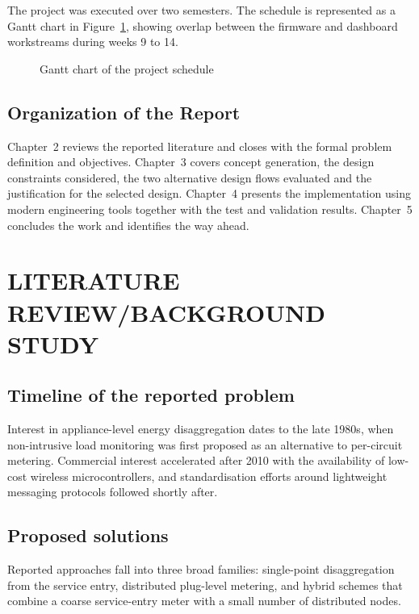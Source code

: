 \documentclass[12pt,a4paper]{report}
\newcommand{\phbox}[2][0.72\textwidth]{%
  \fbox{\parbox[c][#2][c]{#1}{\centering\fontsize{34}{40}\selectfont Figure}}%
}
\begin{document}
The project was executed over two semesters. The schedule is represented as a
Gantt chart in Figure~\ref{fig:gantt}, showing overlap between the firmware and
dashboard workstreams during weeks 9 to 14.

\begin{figure}[H]
  \centering
  \phbox{2.6in}
  \caption{Gantt chart of the project schedule}
  \label{fig:gantt}
\end{figure}

\section{Organization of the Report}

Chapter~2 reviews the reported literature and closes with the formal problem
definition and objectives. Chapter~3 covers concept generation, the design
constraints considered, the two alternative design flows evaluated and the
justification for the selected design. Chapter~4 presents the implementation
using modern engineering tools together with the test and validation results.
Chapter~5 concludes the work and identifies the way ahead.

\chapter{LITERATURE REVIEW/BACKGROUND STUDY}

\section{Timeline of the reported problem}

Interest in appliance-level energy disaggregation dates to the late 1980s, when
non-intrusive load monitoring was first proposed as an alternative to
per-circuit metering. Commercial interest accelerated after 2010 with the
availability of low-cost wireless microcontrollers, and standardisation efforts
around lightweight messaging protocols followed shortly after.

\section{Proposed solutions}

Reported approaches fall into three broad families: single-point disaggregation
from the service entry, distributed plug-level metering, and hybrid schemes
that combine a coarse service-entry meter with a small number of distributed
nodes.
\end{document}
